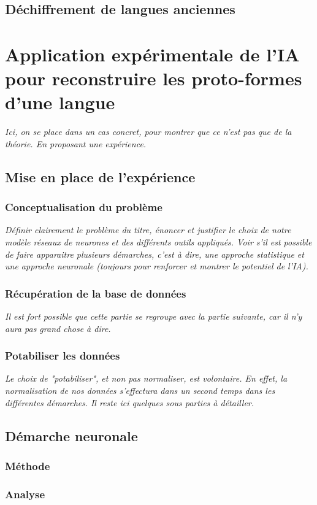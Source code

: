 \documentclass[12pt, a4, french]{report}
\begin{document}
\section{Déchiffrement de langues anciennes}

\chapter{Application expérimentale de l'IA pour reconstruire les proto-formes d'une langue}
\textit{Ici, on se place dans un cas concret, pour montrer que ce n'est pas que de la théorie. En proposant une expérience.}
\section{Mise en place de l'expérience}
\subsection{Conceptualisation du problème}
\textit{Définir clairement le problème du titre, énoncer et justifier le choix de notre modèle réseaux de neurones et des différents outils appliqués. Voir s'il est possible de faire apparaitre plusieurs démarches, c'est à dire, une approche statistique et une approche neuronale (toujours pour renforcer et montrer le potentiel de l'IA).}
\subsection{Récupération de la base de données}
\textit{Il est fort possible que cette partie se regroupe avec la partie suivante, car il n'y aura pas grand chose à dire.}
\subsection{Potabiliser les données}
\textit{Le choix de "potabiliser", et non pas normaliser, est volontaire. En effet, la normalisation de nos données s'effectura dans un second temps dans les différentes démarches.}
\textit{Il reste ici quelques sous parties à détailler.}
\section{Démarche neuronale}
\subsection{Méthode}
\subsection{Analyse}
\end{document}
